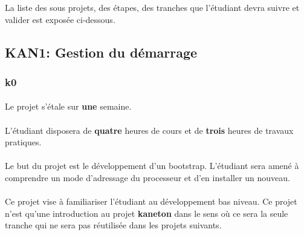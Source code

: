 \documentclass[10pt,a4wide]{article}
\begin{document}
La liste des sous projets, des \'etapes, des tranches que l'\'etudiant
devra suivre et valider est expos\'ee ci-dessous.

\newpage

\subsection{KAN1: Gestion du d\'emarrage}

\paragraph{}

\subsubsection{k0}

\paragraph{}

Le projet s'\'etale sur \textbf{une} semaine.

\paragraph{}

L'\'etudiant disposera de \textbf{quatre} heures de cours et de \textbf{trois}
heures de travaux pratiques.

\paragraph{}

Le but du projet est le d\'eveloppement d'un bootstrap.
L'\'etudiant sera amen\'e \`a comprendre un mode d'adressage du processeur
et d'en installer un nouveau.

\paragraph{}

Ce projet vise \`a familiariser l'\'etudiant au d\'eveloppement bas
niveau. Ce projet n'est qu'une introduction au projet \textbf{kaneton}
dans le sens o\`u ce sera la seule tranche qui ne sera pas r\'eutilis\'ee
dans les projets suivants.

\paragraph{}
\end{document}
